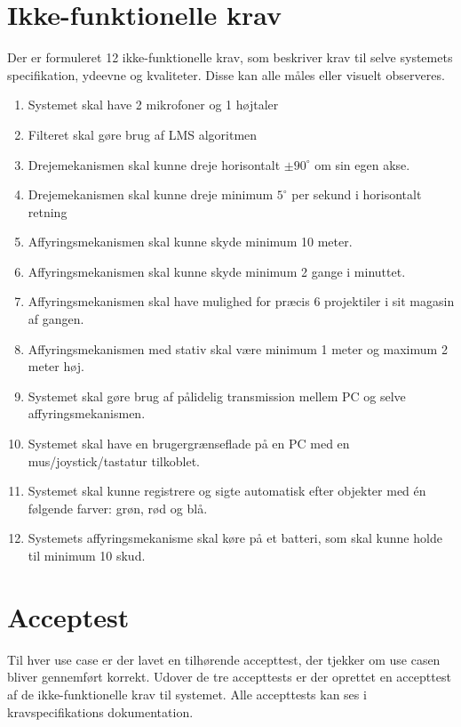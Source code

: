 \newpage
\section{Ikke-funktionelle krav}
Der er formuleret 12 ikke-funktionelle krav, som beskriver krav til selve systemets specifikation, ydeevne og kvaliteter. Disse kan alle måles eller visuelt observeres.
\begin{enumerate}
	\item Systemet skal have 2 mikrofoner og 1 højtaler
	
	\item Filteret skal gøre brug af LMS algoritmen
	
	\item Drejemekanismen skal kunne dreje horisontalt $\pm90^\circ$ om sin egen akse.
	
	\item Drejemekanismen skal kunne dreje minimum $5^\circ$ per sekund i horisontalt retning
	
	\item Affyringsmekanismen skal kunne skyde minimum 10 meter.
	
	\item Affyringsmekanismen skal kunne skyde minimum 2 gange i minuttet.
	
	\item Affyringsmekanismen skal have mulighed for præcis 6 projektiler i sit magasin af gangen.
	
	\item Affyringsmekanismen med stativ skal være minimum 1 meter og maximum 2 meter høj.
	
	\item Systemet skal gøre brug af pålidelig transmission mellem PC og selve affyringsmekanismen.
	
	\item Systemet skal have en brugergrænseflade på en PC med en mus/joystick/tastatur tilkoblet.
	
	
	\item Systemet skal kunne registrere og sigte automatisk efter objekter med én følgende farver: grøn, rød og blå.
	
	\item Systemets affyringsmekanisme skal køre på et batteri, som skal kunne holde til minimum 10 skud.
\end{enumerate}


\section{Acceptest}
Til hver use case er der lavet en tilhørende accepttest, der tjekker om use casen bliver gennemført korrekt. Udover de tre accepttests er der oprettet en accepttest af de ikke-funktionelle krav til systemet. Alle accepttests kan ses
i kravspecifikations dokumentation.